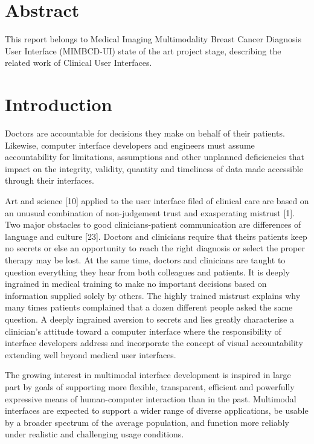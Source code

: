 \begin{titlepage}

\vfill %

\end{titlepage}

\section{Abstract}

This report belongs to Medical Imaging Multimodality Breast Cancer Diagnosis User Interface (MIMBCD-UI) state of the art project stage, describing the related work of Clinical User Interfaces.

\section{Introduction}

Doctors are accountable for decisions they make on behalf of their patients. Likewise, computer interface developers and engineers must assume accountability for limitations, assumptions and other unplanned deficiencies that impact on the integrity, validity, quantity and timeliness of data made accessible through their interfaces.

Art and science [10] applied to the user interface filed of clinical care are based on an unusual combination of non-judgement trust and exasperating mistrust [1]. Two major obstacles to good clinicians-patient communication are differences of language and culture [23]. Doctors and clinicians require that theirs patients keep no secrets or else an opportunity to reach the right diagnosis or select the proper therapy may be lost. At the same time, doctors and clinicians are taught to question everything they hear from both colleagues and patients. It is deeply ingrained in medical training to make no important decisions based on information supplied solely by others. The highly trained mistrust explains why many times patients complained that a dozen different people asked the same question. A deeply ingrained aversion to secrets and lies greatly characterise a clinician’s attitude toward a computer interface where the responsibility of interface developers address and incorporate the concept of visual accountability extending well beyond medical user interfaces.

The growing interest in multimodal interface development is inspired in large part by goals of supporting more flexible, transparent, efficient and powerfully expressive means of human-computer interaction than in the past. Multimodal interfaces are expected to support a wider range of diverse applications, be usable by a broader spectrum of the average population, and function more reliably under realistic and challenging usage conditions.

